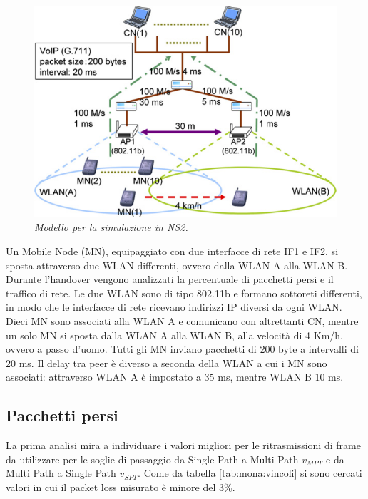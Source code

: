 \documentclass[12pt,a4paper,openright,twoside]{book}
\begin{document}
\begin{figure}[tb]
  \centering
  \includegraphics[width=\textwidth]{img/mona-qos-sim-model}
  \caption{\em Modello per la simulazione in NS2.}
  \label{fig:mona:qos-sim-model}
\end{figure}

Un Mobile Node (MN), equipaggiato con due interfacce di rete IF1 e
IF2, si sposta attraverso due WLAN differenti, ovvero dalla WLAN A
alla WLAN B. Durante l'handover vengono analizzati la percentuale di
pacchetti persi e il traffico di rete. Le due WLAN sono di tipo
802.11b e formano sottoreti differenti, in modo che le interfacce di
rete ricevano indirizzi IP diversi da ogni WLAN. Dieci MN sono
associati alla WLAN A e comunicano con altrettanti CN, mentre un solo
MN si sposta dalla WLAN A alla WLAN B, alla velocità di 4 Km/h, ovvero
a passo d'uomo. Tutti gli MN inviano pacchetti di 200 byte a
intervalli di 20 ms. Il delay tra peer è diverso a seconda della WLAN
a cui i MN sono associati: attraverso WLAN A è impostato a 35 ms,
mentre WLAN B 10 ms.

\subsection{Pacchetti persi}
\label{sec:mona:sim-packet-loss}

La prima analisi mira a individuare i valori migliori per le
ritrasmissioni di frame da utilizzare per le soglie di passaggio da
Single Path a Multi Path $v_{MPT}$ e da Multi Path a Single Path
$v_{SPT}$. Come da tabella \ref{tab:mona:vincoli} si sono cercati
valori in cui il packet loss misurato è minore del 3\%.
\end{document}
